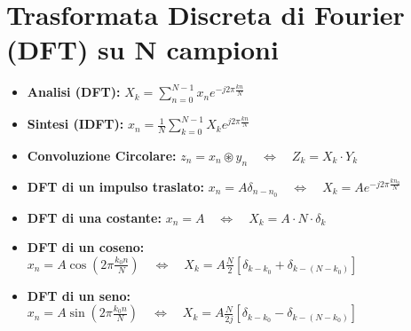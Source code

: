 \section{Trasformata Discreta di Fourier (DFT) su N campioni}
\begin{itemize}
    \item \textbf{Analisi (DFT):} $X_k = \sum_{n=0}^{N-1} x_n e^{-j2\pi \frac{kn}{N}}$
    \item \textbf{Sintesi (IDFT):} $x_n = \frac{1}{N} \sum_{k=0}^{N-1} X_k e^{j2\pi \frac{kn}{N}}$
    \item \textbf{Convoluzione Circolare:} $z_n = x_n \circledast y_n \quad \iff \quad Z_k = X_k \cdot Y_k$
    \item \textbf{DFT di un impulso traslato:} $x_n = A \delta_{n-n_0} \quad \iff \quad X_k = A e^{-j2\pi \frac{kn_0}{N}}$
    \item \textbf{DFT di una costante:} $x_n = A \quad \iff \quad X_k = A \cdot N \cdot \delta_k$
    \item \textbf{DFT di un coseno:} $x_n = A \cos\left(2\pi \frac{k_0 n}{N}\right) \quad \iff \quad X_k = A \frac{N}{2}[\delta_{k-k_0} + \delta_{k-(N-k_0)}]$
    \item \textbf{DFT di un seno:} $x_n = A \sin\left(2\pi \frac{k_0 n}{N}\right) \quad \iff \quad X_k = A \frac{N}{2j}[\delta_{k-k_0} - \delta_{k-(N-k_0)}]$
\end{itemize}
